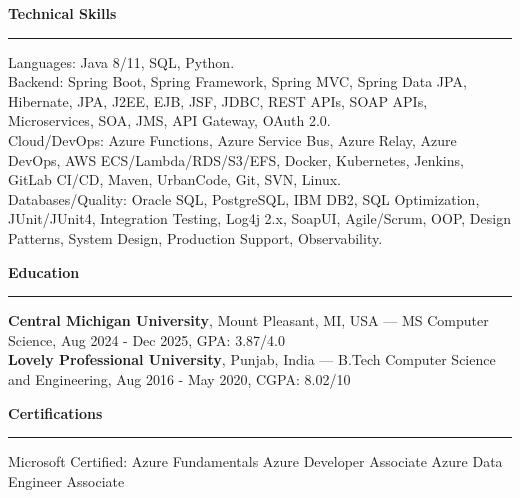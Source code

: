 \documentclass[10pt,letterpaper]{article}
\newcommand{\ressection}[1]{\vspace{3pt}\par\textbf{#1}\par\vspace{1pt}\hrule\vspace{2pt}}
\begin{document}
\ressection{Technical Skills}
Languages: Java 8/11, SQL, Python.\\
Backend: Spring Boot, Spring Framework, Spring MVC, Spring Data JPA, Hibernate, JPA, J2EE, EJB, JSF, JDBC, REST APIs, SOAP APIs, Microservices, SOA, JMS, API Gateway, OAuth 2.0.\\
Cloud/DevOps: Azure Functions, Azure Service Bus, Azure Relay, Azure DevOps, AWS ECS/Lambda/RDS/S3/EFS, Docker, Kubernetes, Jenkins, GitLab CI/CD, Maven, UrbanCode, Git, SVN, Linux.\\
Databases/Quality: Oracle SQL, PostgreSQL, IBM DB2, SQL Optimization, JUnit/JUnit4, Integration Testing, Log4j 2.x, SoapUI, Agile/Scrum, OOP, Design Patterns, System Design, Production Support, Observability.

\ressection{Education}
\textbf{Central Michigan University}, Mount Pleasant, MI, USA --- MS Computer Science, Aug 2024 - Dec 2025, GPA: 3.87/4.0\\
\textbf{Lovely Professional University}, Punjab, India --- B.Tech Computer Science and Engineering, Aug 2016 - May 2020, CGPA: 8.02/10

\ressection{Certifications}
Microsoft Certified: Azure Fundamentals \textbar{} Azure Developer Associate \textbar{} Azure Data Engineer Associate
\end{document}
